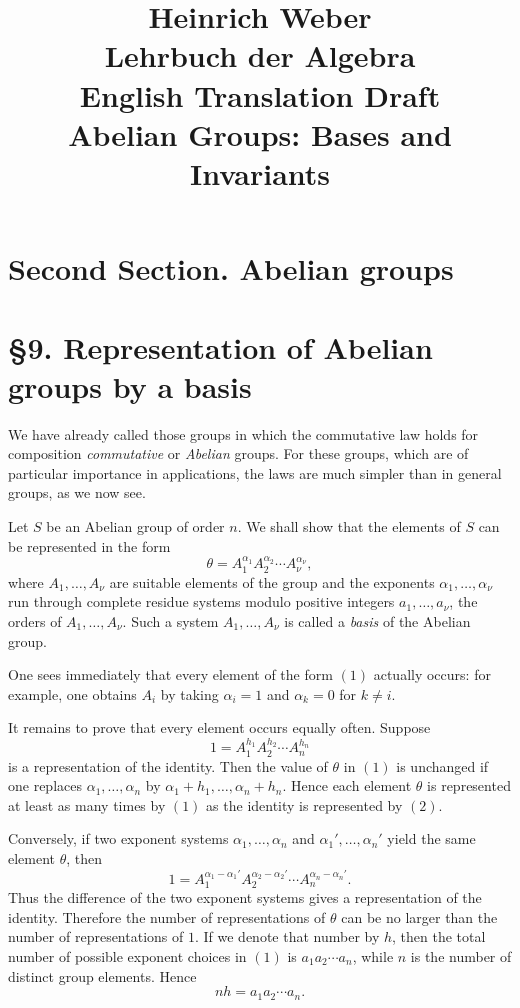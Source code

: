 \documentclass[11pt]{article}
\title{Heinrich Weber\\Lehrbuch der Algebra\\English Translation Draft\\Abelian Groups: Bases and Invariants}
\author{}
\date{}
\begin{document}
\maketitle

\section*{Second Section. Abelian groups}

\section*{\S 9. Representation of Abelian groups by a basis}

We have already called those groups in which the commutative law holds for composition \emph{commutative} or \emph{Abelian} groups. For these groups, which are of particular importance in applications, the laws are much simpler than in general groups, as we now see.

Let \(S\) be an Abelian group of order \(n\). We shall show that the elements of \(S\) can be represented in the form
\[
\theta=A_1^{\alpha_1}A_2^{\alpha_2}\cdots A_\nu^{\alpha_\nu},
\tag{1}
\]
where \(A_1,\dots,A_\nu\) are suitable elements of the group and the exponents \(\alpha_1,\dots,\alpha_\nu\) run through complete residue systems modulo positive integers \(a_1,\dots,a_\nu\), the orders of \(A_1,\dots,A_\nu\). Such a system \(A_1,\dots,A_\nu\) is called a \emph{basis} of the Abelian group.

One sees immediately that every element of the form \((1)\) actually occurs: for example, one obtains \(A_i\) by taking \(\alpha_i=1\) and \(\alpha_k=0\) for \(k\neq i\).

It remains to prove that every element occurs equally often. Suppose
\[
1=A_1^{h_1}A_2^{h_2}\cdots A_n^{h_n}
\tag{2}
\]
is a representation of the identity. Then the value of \(\theta\) in \((1)\) is unchanged if one replaces \(\alpha_1,\dots,\alpha_n\) by \(\alpha_1+h_1,\dots,\alpha_n+h_n\). Hence each element \(\theta\) is represented at least as many times by \((1)\) as the identity is represented by \((2)\).

Conversely, if two exponent systems \(\alpha_1,\dots,\alpha_n\) and \(\alpha_1',\dots,\alpha_n'\) yield the same element \(\theta\), then
\[
1=A_1^{\alpha_1-\alpha_1'}A_2^{\alpha_2-\alpha_2'}\cdots A_n^{\alpha_n-\alpha_n'}.
\tag{3}
\]
Thus the difference of the two exponent systems gives a representation of the identity. Therefore the number of representations of \(\theta\) can be no larger than the number of representations of \(1\). If we denote that number by \(h\), then the total number of possible exponent choices in \((1)\) is \(a_1a_2\cdots a_n\), while \(n\) is the number of distinct group elements. Hence
\[
nh=a_1a_2\cdots a_n.
\tag{4}
\]
\end{document}
